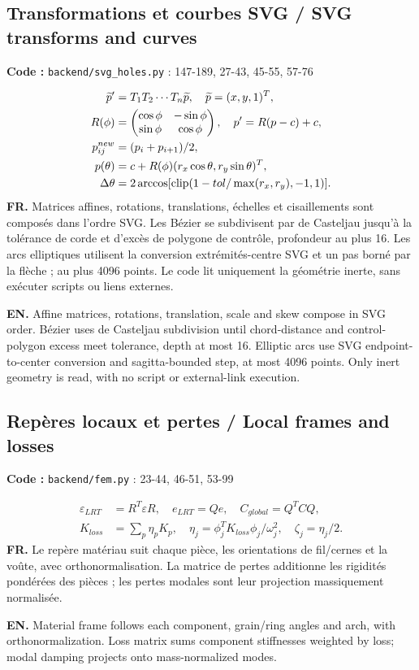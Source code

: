 \documentclass[10pt,a4paper]{article}
\newcommand{\FR}[1]{\textbf{FR.} #1\par}\newcommand{\EN}[1]{{\selectlanguage{english}\textbf{EN.} #1\par}}
\newcommand{\loc}[1]{{\small\color{ink}\textbf{Code :} #1\par}}
\begin{document}
\begin{samepage}\subsection{Transformations et courbes SVG / SVG transforms and curves}
\loc{\texttt{backend/svg\_holes.py} : 147-189, 27-43, 45-55, 57-76}
\begin{align}\widetilde p'&=T_1T_2\cdots T_n\widetilde p,\quad\widetilde p=(x,y,1)^T,\\
R(\phi)&=\begin{pmatrix}\cos\phi&-\sin\phi\\\sin\phi&\cos\phi\end{pmatrix},\quad p'=R(p-c)+c,\\
p_{ij}^{new}&=(p_i+p_{i+1})/2,\\
p(\theta)&=c+R(\phi)(r_x\cos\theta,r_y\sin\theta)^T,\\
\Delta\theta&=2\arccos[\operatorname{clip}(1-tol/\max(r_x,r_y),-1,1)].\end{align}
\FR{Matrices affines, rotations, translations, échelles et cisaillements sont composés dans l’ordre SVG. Les Bézier se subdivisent par de Casteljau jusqu’à la tolérance de corde et d’excès de polygone de contrôle, profondeur au plus 16. Les arcs elliptiques utilisent la conversion extrémités-centre SVG et un pas borné par la flèche ; au plus 4096 points. Le code lit uniquement la géométrie inerte, sans exécuter scripts ou liens externes.}
\EN{Affine matrices, rotations, translation, scale and skew compose in SVG order. Bézier uses de Casteljau subdivision until chord-distance and control-polygon excess meet tolerance, depth at most 16. Elliptic arcs use SVG endpoint-to-center conversion and sagitta-bounded step, at most 4096 points. Only inert geometry is read, with no script or external-link execution.}
\end{samepage}
\begin{samepage}\subsection{Repères locaux et pertes / Local frames and losses}
\loc{\texttt{backend/fem.py} : 23-44, 46-51, 53-99}
\begin{align}\varepsilon_{LRT}&=R^T\varepsilon R,\quad e_{LRT}=Qe,\quad C_{global}=Q^TCQ,\\
K_{loss}&=\sum_p\eta_p K_p,\quad\eta_j=\phi_j^TK_{loss}\phi_j/\omega_j^2,\quad\zeta_j=\eta_j/2.\end{align}
\FR{Le repère matériau suit chaque pièce, les orientations de fil/cernes et la voûte, avec orthonormalisation. La matrice de pertes additionne les rigidités pondérées des pièces ; les pertes modales sont leur projection massiquement normalisée.}
\EN{Material frame follows each component, grain/ring angles and arch, with orthonormalization. Loss matrix sums component stiffnesses weighted by loss; modal damping projects onto mass-normalized modes.}
\end{samepage}
\end{document}

